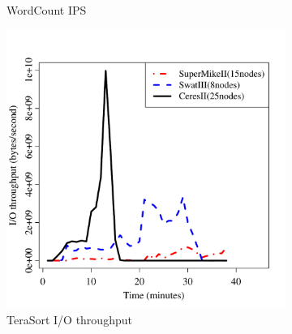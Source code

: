 \documentclass[journal]{IEEEtran}
\begin{document}
\begin{figure}[htb]
\begin{subfigure}[b]{0.23\textwidth}
                \caption{WordCount IPS}
                \label{fig:WordCountIPS}
   \end{subfigure}
   
   	\begin{subfigure}[b]{0.23\textwidth}
                \includegraphics[width=\textwidth]{Figures/SystemFigures/TeraSortIO.pdf}
                \caption{TeraSort I/O throughput}
                \label{fig:TeraSortIO}
    \end{subfigure}
 	\begin{subfigure}[b]{0.24\textwidth}

\end{subfigure}
\end{figure}
\end{document}
